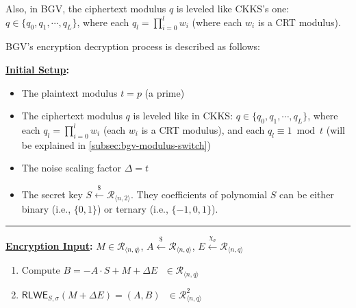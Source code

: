 Also, in BGV, the ciphertext modulus $q$ is leveled like CKKS's one: $q \in \{q_0, q_1, \cdots, q_L\}$, where each $q_l = \prod\limits_{i=0}^l w_i$ (where each $w_i$ is a CRT modulus). 

BGV's encryption decryption process is described as follows:


\begin{tcolorbox}[title={\textbf{\tboxlabel{\ref*{subsec:bgv-enc-dec}} BGV Encryption and Decryption}}]

\textbf{\underline{Initial Setup}:} 

\begin{itemize}
\item The plaintext modulus $t = p$ (a prime)

\item The ciphertext modulus $q$ is leveled like in CKKS: $q \in \{q_0, q_1, \cdots, q_L\}$, where each $q_l = \prod\limits_{i=0}^l w_i$ (each $w_i$ is a CRT modulus), and each $q_l \equiv 1 \bmod t$ (will be explained in \autoref{subsec:bgv-modulus-switch})

\item The noise scaling factor $\Delta=t$ 
\item The secret key $S \xleftarrow{\$} \mathcal{R}_{\langle n, 2 \rangle}$. They coefficients of polynomial $S$ can be either binary (i.e., $\{0, 1\}$) or ternary (i.e., $\{-1, 0, 1\}$).

\end{itemize}

\par\noindent\rule{\textwidth}{0.4pt}

\textbf{\underline{Encryption Input}:} $M \in \mathcal{R}_{\langle n, q \rangle}$, $A \xleftarrow{\$} \mathcal{R}_{\langle n, q \rangle}$, $E \xleftarrow{\chi_\sigma} \mathcal{R}_{\langle n, q \rangle}$


\begin{enumerate}

\item Compute $B = -A \cdot S + M + \Delta E \text{ } \in \mathcal{R}_{\langle n,q \rangle}$

\item $\textsf{RLWE}_{S,\sigma}(M + \Delta E) = (A, B) \text{ } \in \mathcal{R}_{\langle n,q \rangle}^2$ 

\end{enumerate}


\end{tcolorbox}
